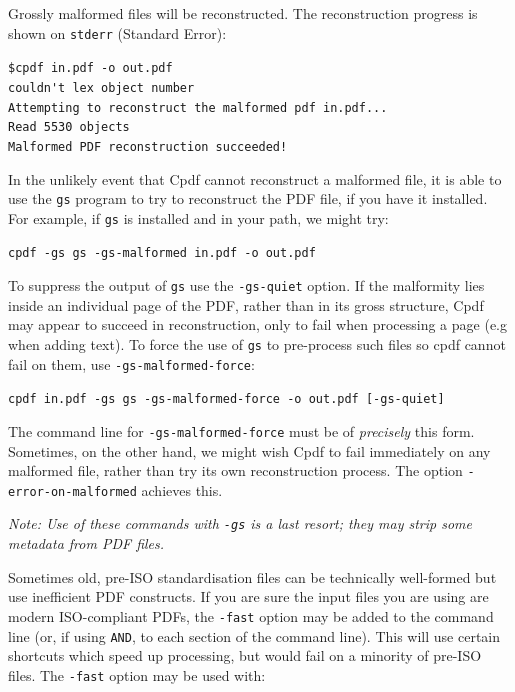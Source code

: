 \documentclass{book}
\begin{document}
Grossly malformed files will be reconstructed. The reconstruction
progress is shown on \verb!stderr! (Standard Error):

\begin{framed}
\noindent\small\verb!$cpdf in.pdf -o out.pdf!\\
\small\verb!couldn't lex object number!\\
\small\verb!Attempting to reconstruct the malformed pdf in.pdf...!\\
\small\verb!Read 5530 objects!\\
\small\verb$Malformed PDF reconstruction succeeded!$
\end{framed}

\noindent In the unlikely event that Cpdf cannot reconstruct a malformed file, it is able to use the \texttt{gs} program to try to reconstruct the PDF file, if you have it installed. For example, if \texttt{gs} is installed and in your path, we might try:

\begin{framed}
\noindent\small\verb!cpdf -gs gs -gs-malformed in.pdf -o out.pdf!\end{framed}

\noindent To suppress the output of \texttt{gs} use the \texttt{-gs-quiet} option. If the malformity lies inside an individual page of the PDF, rather than in its gross structure, Cpdf may appear to succeed in reconstruction, only to fail when processing a page (e.g when adding text). To force the use of \texttt{gs} to pre-process such files so cpdf cannot fail on them, use \texttt{-gs\--malformed\--force}:

\begin{framed}
\noindent\small\verb!cpdf in.pdf -gs gs -gs-malformed-force -o out.pdf [-gs-quiet]!\end{framed}

\noindent The command line for \texttt{-gs-malformed-force} must be of \textit{precisely} this form. Sometimes, on the other hand, we might wish Cpdf to fail immediately on any malformed file, rather than try its own reconstruction process. The option \texttt{-error-on-malformed} achieves this.


\begin{framed}\noindent\textit{Note: Use of these commands with \texttt{-gs} is a last resort; they may strip some metadata from PDF files.}\end{framed}

\noindent Sometimes old, pre-ISO standardisation files can be technically well-formed but use inefficient PDF constructs.  If you are sure the input files you are using are
modern ISO-compliant PDFs, the \texttt{-fast} option may be added to the command line (or, if
using \texttt{AND}, to each section of the command line). This will use certain
shortcuts which speed up processing, but would fail on a minority of pre-ISO files. The \verb!-fast! option may be used with:
\end{document}
